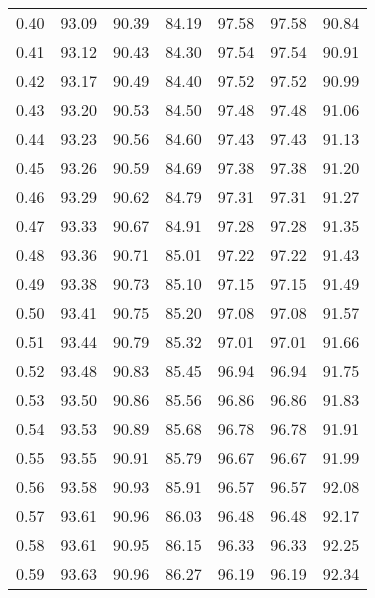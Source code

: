 \begin{tabular}{|c|c|c|c|c|c|c|}
      0.40 &     93.09 &     90.39 &      84.19 &   97.58 &      97.58 &         90.84 \\
      0.41 &     93.12 &     90.43 &      84.30 &   97.54 &      97.54 &         90.91 \\
      0.42 &     93.17 &     90.49 &      84.40 &   97.52 &      97.52 &         90.99 \\
      0.43 &     93.20 &     90.53 &      84.50 &   97.48 &      97.48 &         91.06 \\
      0.44 &     93.23 &     90.56 &      84.60 &   97.43 &      97.43 &         91.13 \\
      0.45 &     93.26 &     90.59 &      84.69 &   97.38 &      97.38 &         91.20 \\
      0.46 &     93.29 &     90.62 &      84.79 &   97.31 &      97.31 &         91.27 \\
      0.47 &     93.33 &     90.67 &      84.91 &   97.28 &      97.28 &         91.35 \\
      0.48 &     93.36 &     90.71 &      85.01 &   97.22 &      97.22 &         91.43 \\
      0.49 &     93.38 &     90.73 &      85.10 &   97.15 &      97.15 &         91.49 \\
      0.50 &     93.41 &     90.75 &      85.20 &   97.08 &      97.08 &         91.57 \\
      0.51 &     93.44 &     90.79 &      85.32 &   97.01 &      97.01 &         91.66 \\
      0.52 &     93.48 &     90.83 &      85.45 &   96.94 &      96.94 &         91.75 \\
      0.53 &     93.50 &     90.86 &      85.56 &   96.86 &      96.86 &         91.83 \\
      0.54 &     93.53 &     90.89 &      85.68 &   96.78 &      96.78 &         91.91 \\
      0.55 &     93.55 &     90.91 &      85.79 &   96.67 &      96.67 &         91.99 \\
      0.56 &     93.58 &     90.93 &      85.91 &   96.57 &      96.57 &         92.08 \\
      0.57 &     93.61 &     90.96 &      86.03 &   96.48 &      96.48 &         92.17 \\
      0.58 &     93.61 &     90.95 &      86.15 &   96.33 &      96.33 &         92.25 \\
      0.59 &     93.63 &     90.96 &      86.27 &   96.19 &      96.19 &         92.34 \\

\end{tabular}
